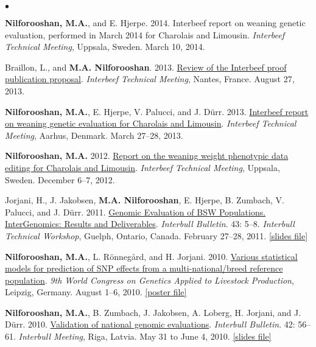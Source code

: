 \documentclass[margin,line]{res}
\newenvironment{list2}{
  \begin{list}{$\bullet$}{%
      \setlength{\itemsep}{0in}
      \setlength{\parsep}{0in} \setlength{\parskip}{0in}
      \setlength{\topsep}{0in} \setlength{\partopsep}{0in}
      \setlength{\leftmargin}{0.2in}}}{\end{list}}
\begin{document}
\begin{resume}
\begin{list2}
\item {\bf Nilforooshan, M.A.}, and E. Hjerpe. 2014. Interbeef report on weaning genetic evaluation, performed in March 2014 for Charolais and Limousin. {\em Interbeef Technical Meeting}, Uppsala, Sweden. March 10, 2014.
\item Braillon, L., and {\bf M.A. Nilforooshan}. 2013. \href{https://drive.google.com/file/d/0B2l_izQwJmVpYWE2VndwNGhJblU/view?usp=sharing}{Review of the Interbeef proof publication proposal}. {\em Interbeef Technical Meeting}, Nantes, France. August 27, 2013.
\item {\bf Nilforooshan, M.A.}, E. Hjerpe, V. Palucci, and J. D\"{u}rr. 2013. \href{https://drive.google.com/file/d/0B2l_izQwJmVpZ2RRcXc0bS11RmM/view?usp=sharing}{Interbeef report on weaning genetic evaluation for Charolais and Limousin}. {\em Interbeef Technical Meeting}, Aarhus, Denmark. March 27--28, 2013.
\item {\bf Nilforooshan, M.A.} 2012. \href{https://drive.google.com/file/d/0B2l_izQwJmVpLVY5NU1UZGR6czA/view?usp=sharing}{Report on the weaning weight phenotypic data editing for Charolais and Limousin}. {\em Interbeef Technical Meeting}, Uppsala, Sweden. December 6--7, 2012.
\item Jorjani, H., J. Jakobsen, {\bf M.A. Nilforooshan}, E. Hjerpe, B. Zumbach, V. Palucci, and J. D\"{u}rr. 2011. \href{https://journal.interbull.org/index.php/ib/article/view/1250}{Genomic Evaluation of BSW Populations. InterGenomics: Results and Deliverables}. {\em Interbull Bulletin}. 43: 5--8. {\em Interbull Technical Workshop}, Guelph, Ontario, Canada. February 27--28, 2011. \href{https://drive.google.com/file/d/0B2l_izQwJmVpbGh3ZC1iRWhCWVE/view?usp=sharing}{[slides file]}
\item {\bf Nilforooshan, M.A.}, L. R\"{o}nneg\r{a}rd, and H. Jorjani. 2010. \href{http://www.wcgalp.org/proceedings/2010/various-statistical-models-prediction-snp-effects-multi-nationalbreed-reference}{Various statistical models for prediction of SNP effects from a multi-national/breed reference population}. {\em 9th World Congress on Genetics Applied to Livestock Production}, Leipzig, Germany. August 1--6, 2010. \href{https://drive.google.com/file/d/0B2l_izQwJmVpMmxGRzJjMURoTlE/view?usp=sharing}{[poster file]}
\item {\bf Nilforooshan, M.A.}, B. Zumbach, J. Jakobsen, A. Loberg, H. Jorjani, and J. D\"{u}rr. 2010. \href{https://journal.interbull.org/index.php/ib/article/view/1158}{Validation of national genomic evaluations}. {\em Interbull Bulletin}. 42: 56--61. {\em Interbull Meeting}, Riga, Latvia. May 31 to June 4, 2010. \href{https://drive.google.com/file/d/0B2l_izQwJmVpRnlPa0YzS3ZCU1E/view?usp=sharing}{[slides file]}

\end{list2}
\end{resume}
\end{document}
